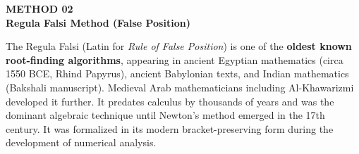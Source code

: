 \documentclass[12pt]{article}
\begin{document}
\newpage


\begin{tcolorbox}[
  enhanced, arc=0pt, boxrule=0pt,
  colback=primary, colframe=primary,
  left=16pt, right=16pt, top=14pt, bottom=10pt,
  borderline south={4pt}{0pt}{accent},
]
  {\color{accent!70}\small\bfseries METHOD 02}\\[4pt]
  {\LARGE\bfseries\color{white} Regula Falsi Method \normalsize\color{lightbg}\quad(False Position)}
\end{tcolorbox}

\vspace{10pt}

\begin{histbox}
The Regula Falsi (Latin for \textit{Rule of False Position}) is one of the \textbf{oldest known root-finding algorithms}, appearing in ancient Egyptian mathematics (circa 1550 BCE, Rhind Papyrus), ancient Babylonian texts, and Indian mathematics (Bakshali manuscript). Medieval Arab mathematicians including Al-Khawarizmi developed it further. It predates calculus by thousands of years and was the dominant algebraic technique until Newton's method emerged in the 17th century. It was formalized in its modern bracket-preserving form during the development of numerical analysis.
\end{histbox}

\bigskip
\end{document}

